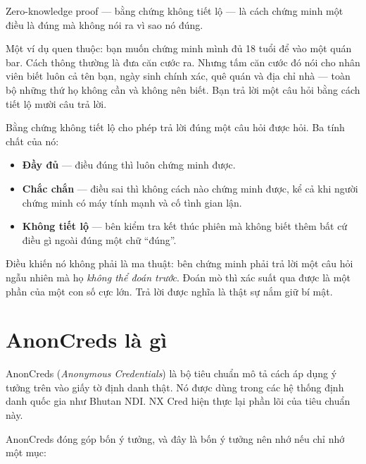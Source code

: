 \documentclass[a4paper,11pt]{article}
\begin{document}
Zero-knowledge proof --- bằng chứng không tiết lộ --- là cách chứng minh một điều là đúng
mà không nói ra vì sao nó đúng.

Một ví dụ quen thuộc: bạn muốn chứng minh mình đủ 18 tuổi để vào một quán bar. Cách thông
thường là đưa căn cước ra. Nhưng tấm căn cước đó nói cho nhân viên biết luôn cả tên bạn,
ngày sinh chính xác, quê quán và địa chỉ nhà --- toàn bộ những thứ họ không cần và không
nên biết. Bạn trả lời một câu hỏi bằng cách tiết lộ mười câu trả lời.

Bằng chứng không tiết lộ cho phép trả lời đúng một câu hỏi được hỏi. Ba tính chất của nó:

\begin{itemize}[leftmargin=1.2em,itemsep=4pt]
  \item \textbf{Đầy đủ} --- điều đúng thì luôn chứng minh được.
  \item \textbf{Chắc chắn} --- điều sai thì không cách nào chứng minh được, kể cả khi
        người chứng minh có máy tính mạnh và cố tình gian lận.
  \item \textbf{Không tiết lộ} --- bên kiểm tra kết thúc phiên mà không biết thêm bất cứ
        điều gì ngoài đúng một chữ ``đúng''.
\end{itemize}

Điều khiến nó không phải là ma thuật: bên chứng minh phải trả lời một câu hỏi ngẫu nhiên
mà họ \emph{không thể đoán trước}. Đoán mò thì xác suất qua được là một phần của một con
số cực lớn. Trả lời được nghĩa là thật sự nắm giữ bí mật.

\section{AnonCreds là gì}
\label{sec:anoncreds}

AnonCreds (\textit{Anonymous Credentials}) là bộ tiêu chuẩn mô tả cách áp dụng ý tưởng
trên vào giấy tờ định danh thật. Nó được dùng trong các hệ thống định danh quốc gia như
Bhutan NDI. NX Cred hiện thực lại phần lõi của tiêu chuẩn này.

AnonCreds đóng góp bốn ý tưởng, và đây là bốn ý tưởng nên nhớ nếu chỉ nhớ một mục:
\end{document}

